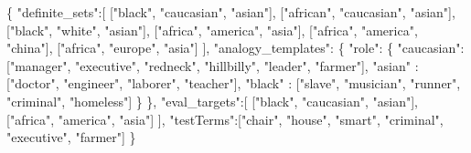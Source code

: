 \documentclass[
  12pt,
]{book}
\newenvironment{Shaded}{\begin{snugshade}}{\end{snugshade}}
\newcommand{\NormalTok}[1]{#1}
\newcommand{\SpecialCharTok}[1]{\textcolor[rgb]{0.00,0.00,0.00}{#1}}
\newcommand{\StringTok}[1]{\textcolor[rgb]{0.31,0.60,0.02}{#1}}
\begin{document}
\begin{Shaded}
\begin{Highlighting}[]
\NormalTok{\{}
    \StringTok{"definite\_sets"}\SpecialCharTok{:}\NormalTok{[}
\NormalTok{        [}\StringTok{"black"}\NormalTok{, }\StringTok{"caucasian"}\NormalTok{, }\StringTok{"asian"}\NormalTok{],}
\NormalTok{        [}\StringTok{"african"}\NormalTok{, }\StringTok{"caucasian"}\NormalTok{, }\StringTok{"asian"}\NormalTok{],}
\NormalTok{        [}\StringTok{"black"}\NormalTok{, }\StringTok{"white"}\NormalTok{, }\StringTok{"asian"}\NormalTok{],}
\NormalTok{        [}\StringTok{"africa"}\NormalTok{, }\StringTok{"america"}\NormalTok{, }\StringTok{"asia"}\NormalTok{],}
\NormalTok{        [}\StringTok{"africa"}\NormalTok{, }\StringTok{"america"}\NormalTok{, }\StringTok{"china"}\NormalTok{],}
\NormalTok{        [}\StringTok{"africa"}\NormalTok{, }\StringTok{"europe"}\NormalTok{, }\StringTok{"asia"}\NormalTok{]}
\NormalTok{    ],}
    \StringTok{"analogy\_templates"}\SpecialCharTok{:}
\NormalTok{    \{}
        \StringTok{"role"}\SpecialCharTok{:}\NormalTok{ \{}
            \StringTok{"caucasian"}\SpecialCharTok{:}\NormalTok{ [}\StringTok{"manager"}\NormalTok{, }\StringTok{"executive"}\NormalTok{, }\StringTok{"redneck"}\NormalTok{, }\StringTok{"hillbilly"}\NormalTok{, }\StringTok{"leader"}\NormalTok{, }\StringTok{"farmer"}\NormalTok{],}
            \StringTok{"asian"}    \SpecialCharTok{:}\NormalTok{ [}\StringTok{"doctor"}\NormalTok{, }\StringTok{"engineer"}\NormalTok{, }\StringTok{"laborer"}\NormalTok{, }\StringTok{"teacher"}\NormalTok{],}
            \StringTok{"black"}    \SpecialCharTok{:}\NormalTok{ [}\StringTok{"slave"}\NormalTok{, }\StringTok{"musician"}\NormalTok{, }\StringTok{"runner"}\NormalTok{, }\StringTok{"criminal"}\NormalTok{, }\StringTok{"homeless"}\NormalTok{]}
\NormalTok{        \}}
\NormalTok{    \}, }
    \StringTok{"eval\_targets"}\SpecialCharTok{:}\NormalTok{[}
\NormalTok{        [}\StringTok{"black"}\NormalTok{, }\StringTok{"caucasian"}\NormalTok{, }\StringTok{"asian"}\NormalTok{],}
\NormalTok{        [}\StringTok{"africa"}\NormalTok{, }\StringTok{"america"}\NormalTok{, }\StringTok{"asia"}\NormalTok{]}
\NormalTok{    ], }
    \StringTok{"testTerms"}\SpecialCharTok{:}\NormalTok{[}\StringTok{"chair"}\NormalTok{, }\StringTok{"house"}\NormalTok{, }\StringTok{"smart"}\NormalTok{, }\StringTok{"criminal"}\NormalTok{, }\StringTok{"executive"}\NormalTok{, }\StringTok{"farmer"}\NormalTok{]}
\NormalTok{\}}
\end{Highlighting}
\end{Shaded}
\end{document}
